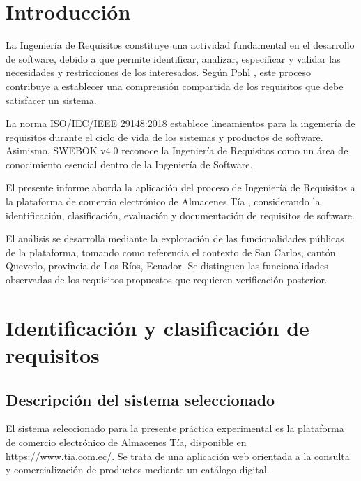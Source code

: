 \documentclass[12pt,a4paper]{article}
\begin{document}
\tableofcontents
\newpage


\section{Introducción}

La Ingeniería de Requisitos constituye una actividad fundamental
en el desarrollo de software, debido a que permite identificar,
analizar, especificar y validar las necesidades y restricciones
de los interesados. Según Pohl \cite{pohl2010}, este proceso
contribuye a establecer una comprensión compartida de los
requisitos que debe satisfacer un sistema.

La norma ISO/IEC/IEEE 29148:2018 \cite{iso29148}
establece lineamientos para la ingeniería de requisitos
durante el ciclo de vida de los sistemas y productos de software.
Asimismo, SWEBOK v4.0 \cite{swebok2024} reconoce la Ingeniería
de Requisitos como un área de conocimiento esencial
dentro de la Ingeniería de Software.

El presente informe aborda la aplicación del proceso
de Ingeniería de Requisitos a la plataforma de comercio
electrónico de Almacenes Tía \cite{tia2026}, considerando
la identificación, clasificación, evaluación y
documentación de requisitos de software.

El análisis se desarrolla mediante la exploración
de las funcionalidades públicas de la plataforma,
tomando como referencia el contexto de San Carlos,
cantón Quevedo, provincia de Los Ríos, Ecuador.
Se distinguen las funcionalidades observadas de los
requisitos propuestos que requieren verificación posterior.



\section{Identificación y clasificación de requisitos}

\subsection{Descripción del sistema seleccionado}

El sistema seleccionado para la presente práctica experimental
es la plataforma de comercio electrónico de Almacenes Tía,
disponible en \url{https://www.tia.com.ec/}. Se trata de una
aplicación web orientada a la consulta y comercialización
de productos mediante un catálogo digital.
\end{document}
